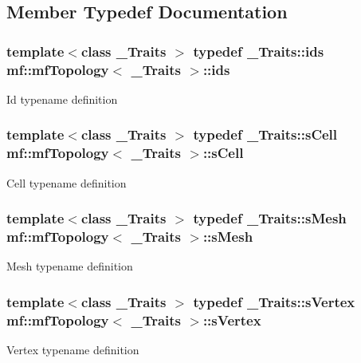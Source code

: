 \subsection{Member Typedef Documentation}
\hypertarget{classmf_1_1mfTopology_ab491100e8580485911e86e63fe3cdaed}{
\subsubsection[{ids}]{\setlength{\rightskip}{0pt plus 5cm}template$<$class \_\-Traits $>$ typedef \_\-Traits::ids {\bf mf::mfTopology}$<$ \_\-Traits $>$::{\bf ids}}}
\label{classmf_1_1mfTopology_ab491100e8580485911e86e63fe3cdaed}
Id typename definition \hypertarget{classmf_1_1mfTopology_afc62aa92ab9d99d296d9c5ae5d7a4919}{
\subsubsection[{sCell}]{\setlength{\rightskip}{0pt plus 5cm}template$<$class \_\-Traits $>$ typedef \_\-Traits::sCell {\bf mf::mfTopology}$<$ \_\-Traits $>$::{\bf sCell}}}
\label{classmf_1_1mfTopology_afc62aa92ab9d99d296d9c5ae5d7a4919}
Cell typename definition \hypertarget{classmf_1_1mfTopology_adea65e34b93c17858d4dadc6eb360711}{
\subsubsection[{sMesh}]{\setlength{\rightskip}{0pt plus 5cm}template$<$class \_\-Traits $>$ typedef \_\-Traits::sMesh {\bf mf::mfTopology}$<$ \_\-Traits $>$::{\bf sMesh}}}
\label{classmf_1_1mfTopology_adea65e34b93c17858d4dadc6eb360711}
Mesh typename definition \hypertarget{classmf_1_1mfTopology_a8f282660d77836ffaa0a373f8652f371}{
\subsubsection[{sVertex}]{\setlength{\rightskip}{0pt plus 5cm}template$<$class \_\-Traits $>$ typedef \_\-Traits::sVertex {\bf mf::mfTopology}$<$ \_\-Traits $>$::{\bf sVertex}}}
\label{classmf_1_1mfTopology_a8f282660d77836ffaa0a373f8652f371}
Vertex typename definition 


